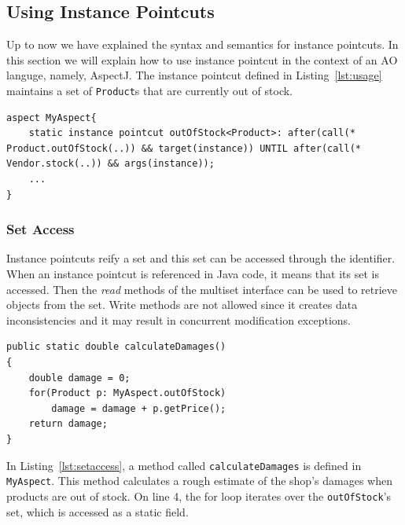 \documentclass{llncs}
\begin{document}
\subsection{Using Instance Pointcuts}
Up to now we have explained the syntax and semantics for instance pointcuts. In this section we will explain how to use instance pointcut in the context of an AO languge, namely, AspectJ. The instance pointcut defined in Listing~\ref{lst:usage} maintains a set of \texttt{Product}s that are currently out of stock.

\begin{lstlisting}[float=h!, caption={An instance pointcut for out of stock products}, label={lst:usage}]
aspect MyAspect{
	static instance pointcut outOfStock<Product>: after(call(* Product.outOfStock(..)) && target(instance)) UNTIL after(call(* Vendor.stock(..)) && args(instance));
	...
}
\end{lstlisting}

\subsubsection{Set Access}
Instance pointcuts reify a set and this set can be accessed through the identifier. When an instance  pointcut is referenced in Java code, it means that its set is accessed. Then the \emph{read} methods of the multiset interface can be used to retrieve objects from the set. Write methods are not allowed since it creates data inconsistencies and it may result in concurrent modification exceptions. 


\begin{lstlisting}[float=h!, caption={Calculate a damage estimate for out of stock products}, label={lst:setaccess}]
public static double calculateDamages()
{
	double damage = 0;
	for(Product p: MyAspect.outOfStock)
		damage = damage + p.getPrice();
	return damage;
}
\end{lstlisting}

In Listing~\ref{lst:setaccess},  a method called \texttt{calculateDamages} is defined in \texttt{MyAspect}. This method calculates a rough estimate of the shop's damages when products are out of stock. On line 4, the for loop iterates over the \texttt{outOfStock}'s set, which is accessed as a static field.
\end{document}
